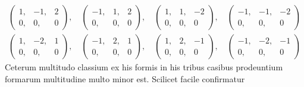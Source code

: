\[
\begin{gathered}
\left(\begin{smallmatrix}1,&-1,&2\\0,&0,&0\end{smallmatrix}\right),\quad
\left(\begin{smallmatrix}-1,&1,&2\\0,&0,&0\end{smallmatrix}\right),\quad
\left(\begin{smallmatrix}1,&1,&-2\\0,&0,&0\end{smallmatrix}\right),\quad
\left(\begin{smallmatrix}-1,&-1,&-2\\0,&0,&0\end{smallmatrix}\right)\\
\left(\begin{smallmatrix}1,&-2,&1\\0,&0,&0\end{smallmatrix}\right),\quad
\left(\begin{smallmatrix}-1,&2,&1\\0,&0,&0\end{smallmatrix}\right),\quad
\left(\begin{smallmatrix}1,&2,&-1\\0,&0,&0\end{smallmatrix}\right),\quad
\left(\begin{smallmatrix}-1,&-2,&-1\\0,&0,&0\end{smallmatrix}\right)
\end{gathered}
\]
Ceterum multitudo classium ex his formis in his tribus casibus prodeuntium formarum multitudine multo minor est. Scilicet facile confirmatur

